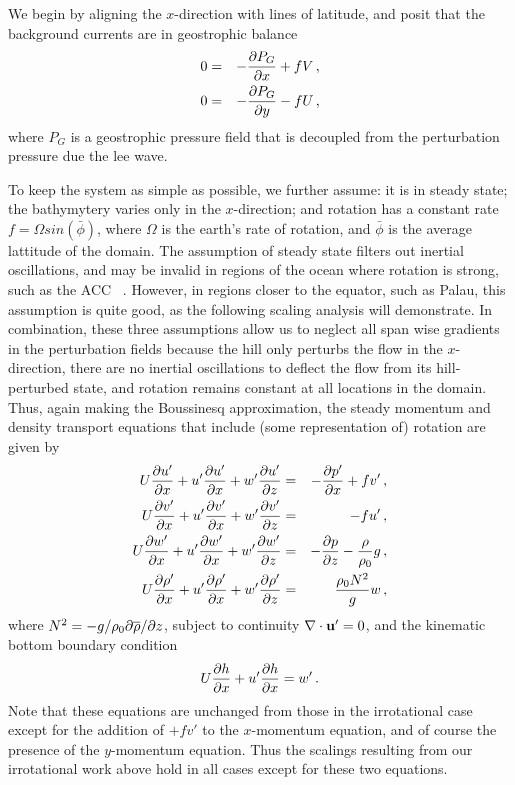\documentclass[12pt]{article}
\begin{document}
We begin by aligning the $x$-direction with lines of latitude, and posit that the background currents are in geostrophic balance
\begin{eqnarray*}
	0 &=& -\frac{\partial{P_G}}{\partial{x}} + fV \,,\\
	0 &=& -\frac{\partial{P_G}}{\partial{y}} - fU \,,\\
\end{eqnarray*}
where $P_G$ is a geostrophic pressure field that is decoupled from the perturbation pressure due the lee wave. 

To keep the system as simple as possible, we further assume: it is in steady state; the bathymytery varies only in the $x$-direction; and rotation has a constant rate $f=\Omega sin(\bar{\phi})$, where $\Omega$ is the earth's rate of rotation, and $\bar{\phi}$ is the average lattitude of the domain. The assumption of steady state filters out inertial oscillations, and may be invalid in regions of the ocean where rotation is strong, such as the ACC ~\citep{Nikurashin2010a}. However, in regions closer to the equator, such as Palau, this assumption is quite good, as the following scaling analysis will demonstrate.  In combination, these three assumptions allow us to neglect all span wise gradients in the perturbation fields because the hill only perturbs the flow in the $x$-direction, there are no inertial oscillations to deflect the flow from its hill-perturbed state, and rotation remains constant at all locations in the domain. Thus, again making the Boussinesq approximation, the steady momentum and density transport equations that include (some representation of) rotation are given by
\begin{eqnarray*}
	U \frac{\partial{u'}}{\partial{x}} +u' \frac{\partial{u'}}{\partial{x}} + w' \frac{\partial{u'}}{\partial{z}} &=& -\frac{\partial{p'}}{\partial{x}} + fv' \,,\\
	U \frac{\partial{v'}}{\partial{x}} + u' \frac{\partial{v'}}{\partial{x}} + w' \frac{\partial{v'}}{\partial{z}} &=& - fu' \,,\\
	U \frac{\partial{w'}}{\partial{x}} + u' \frac{\partial{w'}}{\partial{x}} + w' \frac{\partial{w'}}{\partial{z}} &=& -\frac{\partial{p}}{\partial{z}} - \frac{\rho}{\rho_0} g \,,\\
	U \frac{\partial{\rho'}}{\partial{x}} + u' \frac{\partial{\rho'}}{\partial{x}} + w' \frac{\partial{\rho'}}{\partial{z}} &=& \frac{\rho_0 N^2}{g} w\,,
\end{eqnarray*}
where $N^2 = -g/\rho_0 \partial\overline{\rho}/\partial z$, subject to continuity $\nabla\cdot\mathbf{u}'=0$, and
the kinematic bottom boundary condition
\[
U\frac{\partial{h}}{\partial{x}} + u' \frac{\partial{h}}{\partial{x}} = w'\,.
\]  
Note that these equations are unchanged from those in the irrotational case except for the addition of $+fv'$ to the $x$-momentum equation, and of course the presence of the $y$-momentum equation. Thus the scalings resulting from our irrotational work above hold in all cases except for these two equations. 
\end{document}
